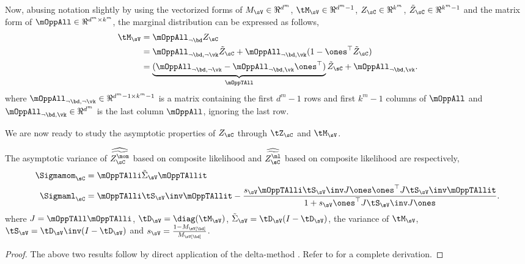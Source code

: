 Now, abusing notation slightly by using the vectorized forms of $M_\sV
\in \Re^{d^m}$, $\tM_\sV \in \Re^{d^m-1}$, $Z_\sC \in \Re^{k^m}$, $\tilde Z_\sC \in \Re^{k^m-1}$
and the matrix form of $\mOppAll \in \Re^{d^m \times k^m}$, the marginal
distribution can be expressed as follows,
\begin{align*}
  \tM_\sV 
        &= \mOppAll_{\neg \bd} Z_\sC \\
        &= \mOppAll_{\neg \bd, \neg \vk} \tilde Z_\sC + \mOppAll_{\neg \bd, \vk} (1 - \ones^\top \tilde Z_\sC) \\
        &= \underbrace{(\mOppAll_{\neg \bd, \neg \vk} -  \mOppAll_{\neg \bd, \vk}\ones^\top)}_{\mOppTAll} \tilde Z_\sC + \mOppAll_{\neg \bd, \vk}.
\end{align*}
where $\mOppAll_{\neg \bd, \neg \vk} \in \Re^{d^m -1 \times k^m - 1}$ is a matrix containing the
first $d^m-1$ rows and first $k^m-1$ columns of $\mOppAll$ and $\mOppAll_{\neg \bd, \vk} \in \Re^{d^m}$ is the last column $\mOppAll$, ignoring the last row. 

We are now ready to study the asymptotic properties of $Z_\sC$ through
$\tZ_\sC$ and $\tM_\sV$.

\providecommand{\hatt}[1] {\widehat{\widetilde{#1}}}
\begin{lemma}
  \label{lem:mom-pw-variance}
  The asymptotic variance of $\hatt{Z^\mom_{\sC}}$ based on composite likelihood and 
  $\hatt{Z^\ml_{\sC}}$ based on composite likelihood are respectively,
  \begin{align*}
    \Sigmamom_\sC &= \mOppTAlli \tilde\Sigma_\sV \mOppTAllit \\
    \Sigmaml_\sC 
    &= \mOppTAlli \tS_\sV\inv \mOppTAllit 
      - \frac{s_\sV \mOppTAlli \tS_\sV\inv J \ones \ones^\top J \tS_\sV\inv \mOppTAllit }
      {1 + s_\sV \ones^\top J \tS_\sV\inv J \ones}.
  \end{align*}
  where $J = \mOppTAll \mOppTAlli$, $\tD_\sV = \diag(\tM_\sV)$, $\tilde \Sigma_\sV = \tD_\sV (I
  - \tD_\sV)$, the variance of $\tM_\sV$, $\tS_\sV = \tD_\sV\inv (I - \tD_\sV)$ and $s_\sV = \frac{1 - M_\sV[\bd]}{M_\sV[\bd]}$.
\end{lemma}
\begin{proof}
  The above two results follow by direct application of the delta-method
  \cite{vaart98asymptotic}. Refer to  for
  a complete derivation.
\end{proof}


